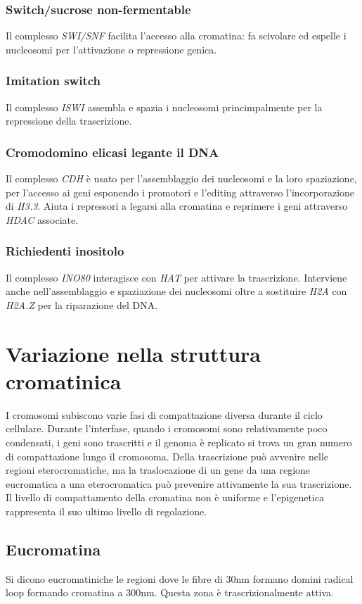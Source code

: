 \subsubsection{Switch/sucrose non-fermentable}
Il complesso \emph{SWI/SNF} facilita l'accesso alla cromatina: fa scivolare ed espelle i nucleosomi per l'attivazione o repressione genica.
\subsubsection{Imitation switch}
Il complesso \emph{ISWI} assembla e spazia i nucleosomi princimpalmente per la repressione della trascrizione.
\subsubsection{Cromodomino elicasi legante il DNA}
Il complesso \emph{CDH} \`e usato per l'assemblaggio dei nucleosomi e la loro spaziazione, per l'accesso ai geni esponendo i promotori e l'editing attraverso l'incorporazione di 
\emph{H3.3}. Aiuta i repressori a legarsi alla cromatina e reprimere i geni attraverso \emph{HDAC} associate.
\subsubsection{Richiedenti inositolo}
Il complesso \emph{INO80} interagisce con \emph{HAT} per attivare la trascrizione. Interviene anche nell'assemblaggio e spaziazione dei nucleosomi oltre a sostituire \emph{H2A} con
\emph{H2A.Z} per la riparazione del DNA.
\section{Variazione nella struttura cromatinica}
I cromosomi subiscono varie fasi di compattazione diversa durante il ciclo cellulare. Durante l'interfase, quando i cromosomi sono relativamente poco condensati, i geni sono 
trascritti e il genoma \`e replicato si trova un gran numero di compattazione lungo il cromosoma. Della trascrizione pu\`o avvenire nelle regioni eterocromatiche, ma la traslocazione
di un gene da una regione eucromatica a una eterocromatica pu\`o prevenire attivamente la sua trascrizione. Il livello di compattamento della cromatina non \`e uniforme e l'epigenetica
rappresenta il suo ultimo livello di regolazione.
\subsection{Eucromatina}
Si dicono eucromatiniche le regioni dove le fibre di \num{30}\si{\nano\metre} formano domini radical loop formando cromatina a \num{300}\si{\nano\metre}. Questa zona \`e 
trascrizionalmente attiva.
